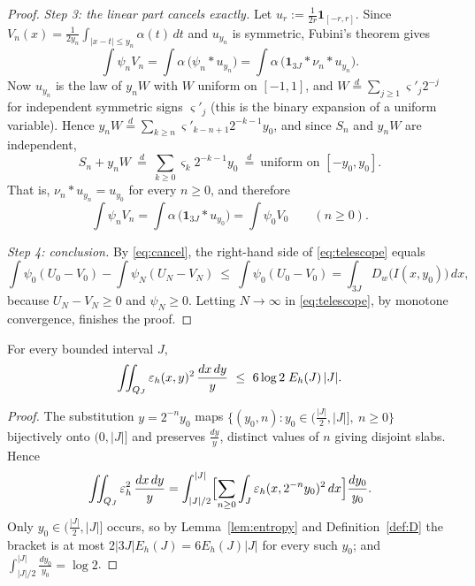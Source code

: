 \begin{proof}
	\medskip
	\noindent\textit{Step 3: the linear part cancels exactly.}
	Let $u_r:=\frac1{2r}\mathbf 1_{[-r,r]}$. Since
	$V_n(x)=\frac1{2y_n}\int_{|x-t|\le y_n}\alpha(t)\,dt$ and $u_{y_n}$ is
	symmetric, Fubini's theorem gives
	\[
	\int\psi_nV_n=\int\alpha\,\bigl(\psi_n*u_{y_n}\bigr)
	=\int\alpha\,\bigl(\mathbf 1_{3J}*\nu_n*u_{y_n}\bigr).
	\]
	Now $u_{y_n}$ is the law of $y_nW$ with $W$ uniform on $[-1,1]$, and
	$W\overset{d}{=}\sum_{j\ge1}\varsigma'_j2^{-j}$ for independent symmetric signs
	$\varsigma'_j$ (this is the binary expansion of a uniform variable). Hence
	$y_nW\overset{d}{=}\sum_{k\ge n}\varsigma'_{k-n+1}2^{-k-1}y_0$, and since $S_n$
	and $y_nW$ are independent,
	\[
	S_n+y_nW\ \overset{d}{=}\ \sum_{k\ge0}\varsigma_k2^{-k-1}y_0
	\ \overset{d}{=}\ \text{uniform on }[-y_0,y_0] .
	\]
	That is, $\nu_n*u_{y_n}=u_{y_0}$ for every $n\ge0$, and therefore
	\begin{equation}\label{eq:cancel}
		\int\psi_nV_n=\int\alpha\,\bigl(\mathbf 1_{3J}*u_{y_0}\bigr)=\int\psi_0V_0
		\qquad(n\ge0).
	\end{equation}
	
	\medskip
	\noindent\textit{Step 4: conclusion.}
	By \eqref{eq:cancel}, the right-hand side of \eqref{eq:telescope} equals
	\[
	\int\psi_0(U_0-V_0)-\int\psi_N(U_N-V_N)\ \le\ \int\psi_0(U_0-V_0)
	=\int_{3J}D_w\bigl(I(x,y_0)\bigr)\,dx ,
	\]
	because $U_N-V_N\ge0$ and $\psi_N\ge0$. Letting $N\to\infty$ in
	\eqref{eq:telescope}, by monotone convergence, finishes the proof.
\end{proof}

\begin{corollary}\label{cor:eps-carleson}
	\leanok
	For every bounded interval $J$,
	\[
	\iint_{Q_J}\eps_h(x,y)^2\,\frac{dx\,dy}{y}\ \le\ 6\log2\;E_h(J)\,|J| .
	\]
\end{corollary}

\begin{proof}
	The substitution $y=2^{-n}y_0$ maps
	$\{(y_0,n):y_0\in(\tfrac{|J|}2,|J|],\ n\ge0\}$ bijectively onto $(0,|J|]$ and
	preserves $\frac{dy}{y}$, distinct values of $n$ giving disjoint slabs. Hence
	\[
	\iint_{Q_J}\varepsilon_h^2\,\frac{dx\,dy}{y}
	=\int_{|J|/2}^{|J|}\Bigl[\sum_{n\ge0}\int_J\varepsilon_h(x,2^{-n}y_0)^2\,dx\Bigr]
	\frac{dy_0}{y_0} .
	\]
	Only $y_0\in(\tfrac{|J|}2,|J|]$ occurs, so by Lemma~\ref{lem:entropy} and
	Definition~\ref{def:D} the bracket is at most $2|3J|E_h(J)=6E_h(J)|J|$ for
	every such $y_0$; and $\int_{|J|/2}^{|J|}\frac{dy_0}{y_0}=\log2$.
\end{proof}

